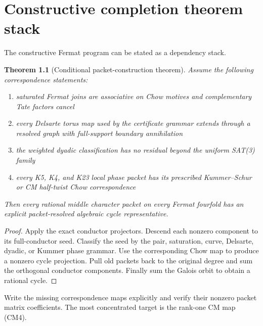 \documentclass[11pt,oneside]{book}
\newtheorem{theorem}{Theorem}[chapter]
\theoremstyle{definition}
\theoremstyle{remark}
\begin{document}
\chapter{Constructive completion theorem stack}
The constructive Fermat program can be stated as a dependency stack.

\begin{theorem}[Conditional packet-construction theorem]
Assume the following correspondence statements:
\begin{enumerate}
\item saturated Fermat joins are associative on Chow motives and complementary Tate factors cancel
\item every Delsarte torus map used by the certificate grammar extends through a resolved graph with full-support boundary annihilation
\item the weighted dyadic classification has no residual beyond the uniform SAT(3) family
\item every K5, K4, and K23 local phase packet has its prescribed Kummer--Schur or CM half-twist Chow correspondence
\end{enumerate}
Then every rational middle character packet on every Fermat fourfold has an explicit packet-resolved algebraic cycle representative.
\end{theorem}
\begin{proof}
Apply the exact conductor projectors. Descend each nonzero component to its full-conductor seed. Classify the seed by the pair, saturation, curve, Delsarte, dyadic, or Kummer phase grammar. Use the corresponding Chow map to produce a nonzero cycle projection. Pull old packets back to the original degree and sum the orthogonal conductor components. Finally sum the Galois orbit to obtain a rational cycle.
\end{proof}

\begin{openproblem}
Write the missing correspondence maps explicitly and verify their nonzero packet matrix coefficients. The most concentrated target is the rank-one CM map (CM4).
\end{openproblem}
\end{document}
